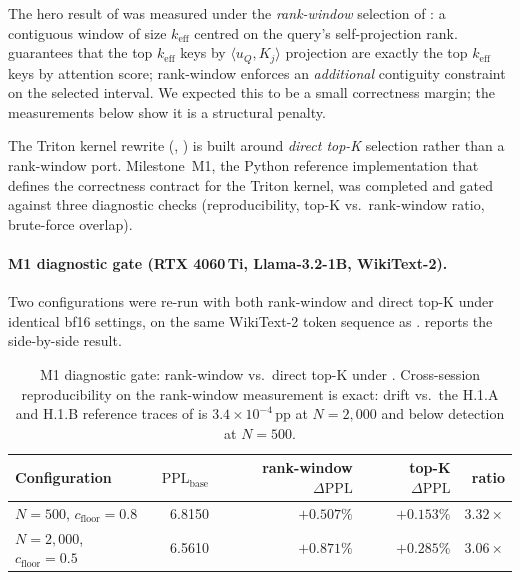 \documentclass[11pt]{article}
\theoremstyle{definition}
\theoremstyle{remark}
\theoremstyle{plain}
\begin{document}
The hero result of  was measured under the \emph{rank-window}
selection of \citet{seqev2025qaxis}: a contiguous window of size $k_\text{eff}$
centred on the query's self-projection rank.  guarantees that
the top $k_\text{eff}$ keys by $\langle u_Q, K_j\rangle$ projection are exactly
the top $k_\text{eff}$ keys by attention score; rank-window enforces an
\emph{additional} contiguity constraint on the selected interval. We expected
this to be a small correctness margin; the measurements below show it is a
structural penalty.

The Triton kernel rewrite (, ) is built
around \emph{direct top-K} selection rather than a rank-window port. Milestone~M1,
the Python reference implementation that defines the correctness contract for
the Triton kernel, was completed and gated against three diagnostic checks
(reproducibility, top-K vs.\ rank-window ratio, brute-force overlap).

\paragraph{M1 diagnostic gate (RTX 4060\,Ti, Llama-3.2-1B, WikiText-2).}
Two configurations were re-run with both rank-window and direct top-K under
identical bf16 settings, on the same WikiText-2 token sequence as
.  reports the side-by-side result.

\begin{table}[h]
  \centering\small
  \caption{M1 diagnostic gate: rank-window vs.\ direct top-K under
    . Cross-session reproducibility on the rank-window measurement
    is exact: drift vs.\ the H.1.A and H.1.B reference traces of
    \citet{seqev2025qaxis} is $3.4\times 10^{-4}\,$pp at $N\!=\!2{,}000$ and
    below detection at $N\!=\!500$.}
  \label{tab:m1}
  \begin{tabular}{lrrrr}
    \toprule
    Configuration & $\mathrm{PPL}_{\text{base}}$
      & rank-window $\Delta\mathrm{PPL}$
      & top-K $\Delta\mathrm{PPL}$
      & ratio \\
    \midrule
    $N\!=\!500$,   $c_{\text{floor}}\!=\!0.8$   & 6.8150 & $+0.507\%$ & $+0.153\%$ & $3.32\times$ \\
    $N\!=\!2{,}000$, $c_{\text{floor}}\!=\!0.5$ & 6.5610 & $+0.871\%$ & $+0.285\%$ & $3.06\times$ \\
    \bottomrule
  \end{tabular}
\end{table}
\end{document}
